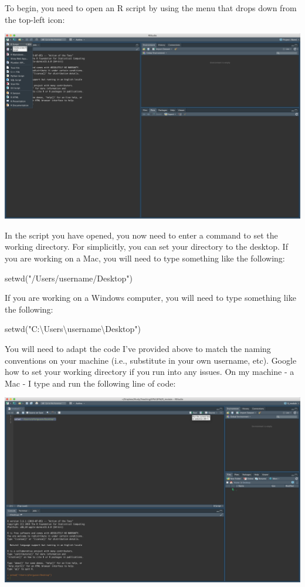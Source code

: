 \documentclass[
]{article}
\newenvironment{Shaded}{\begin{snugshade}}{\end{snugshade}}
\newcommand{\FunctionTok}[1]{\textcolor[rgb]{0.00,0.00,0.00}{#1}}
\newcommand{\NormalTok}[1]{#1}
\newcommand{\StringTok}[1]{\textcolor[rgb]{0.31,0.60,0.02}{#1}}
\begin{document}
To begin, you need to open an R script by using the menu that drops down
from the top-left icon:

\includegraphics{Images/open_script.png}

In the script you have opened, you now need to enter a command to set
the working directory. For simplicitly, you can set your directory to
the desktop. If you are working on a Mac, you will need to type
something like the following:

\begin{Shaded}
\begin{Highlighting}[]
\FunctionTok{setwd}\NormalTok{(}\StringTok{"/Users/username/Desktop"}\NormalTok{)}
\end{Highlighting}
\end{Shaded}

If you are working on a Windows computer, you will need to type
something like the following:

\begin{Shaded}
\begin{Highlighting}[]
\FunctionTok{setwd}\NormalTok{(}\StringTok{"C:\textbackslash{}Users\textbackslash{}username\textbackslash{}Desktop"}\NormalTok{)}
\end{Highlighting}
\end{Shaded}

You will need to adapt the code I've provided above to match the naming
conventions on your machine (i.e., substitute in your own username,
etc). Google how to set your working directory if you run into any
issues. On my machine - a Mac - I type and run the following line of
code:

\includegraphics{Images/run_set_wd.png}
\end{document}
